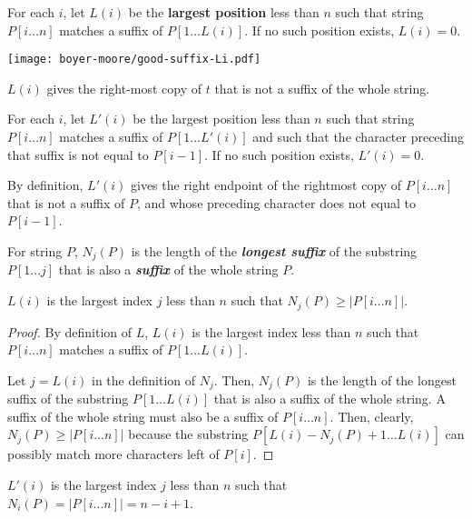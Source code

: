 \begin{definition}
    For each $i$, let $L(i)$ be the \textbf{largest position} less than $n$ such that string $P[i\ldots n]$ matches a suffix of $P[1\ldots L(i)]$. If no such position exists, $L(i) = 0$.
    \begin{marginfigure}
        \texttt{[image: boyer-moore/good-suffix-Li.pdf]}
        \caption{$L(i)$ gives the right-most copy of $t$ that is not a suffix of the whole string.}
        \label{fig:good-suffix-Li}
    \end{marginfigure}
    For each $i$, let $L'(i)$ be the largest position less than $n$ such that string $P[i \ldots n]$ matches a suffix of $P[1\ldots L'(i)]$ and such that the character preceding that suffix is not equal to $P[i-1]$. If no such position exists, $L'(i) = 0$.
\end{definition}

By definition, $L'(i)$ gives the right endpoint of the rightmost copy of $P[i\ldots n]$ that is not a suffix of $P$, and whose preceding character does not equal to $P[i-1]$.

\begin{definition}
    For string $P$, $N_j(P)$ is the length of the \textit{\textbf{longest suffix}} of the substring $P[1\ldots j]$ that is also a \textit{\textbf{suffix}} of the whole string $P$.
\end{definition}

\begin{theorem} \label{thm:good-suffix-Li-property}
    $L(i)$ is the largest index $j$ less than $n$ such that $N_j(P) \geq |P[i\ldots n]|$.
\end{theorem}

\begin{proof}
    By definition of $L$, $L(i)$ is the largest index less than $n$ such that $P[i\ldots n]$ matches a suffix of $P[1\ldots L(i)]$. 
    
    Let $j = L(i)$ in the definition of $N_j$. Then, $N_j(P)$ is the length of the longest suffix of the substring $P[1\ldots L(i)]$ that is also a suffix of the whole string. A suffix of the whole string must also be a suffix of $P[i\ldots n]$. Then, clearly, $N_j(P) \geq |P[i \ldots n]|$ because the substring $P[L(i)-N_j(P)+1 \ldots L(i)]$ can possibly match more characters left of $P[i]$.
\end{proof}

\begin{corollary}
    $L'(i)$ is the largest index $j$ less than $n$ such that $N_i(P) = |P[i\ldots n]| = n-i+1$.
\end{corollary}

